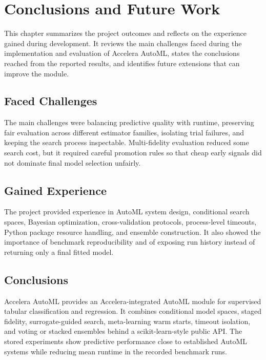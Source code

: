 \documentclass[12pt,a4paper,oneside]{report}
\newcommand{\systemname}{Accelera AutoML}
\begin{document}
\chapter{Conclusions and Future Work}
\label{chap:conclusion}

This chapter summarizes the project outcomes and reflects on the experience
gained during development. It reviews the main challenges faced during the
implementation and evaluation of \systemname{}, states the conclusions reached
from the reported results, and identifies future extensions that can improve
the module.

\section{Faced Challenges}

The main challenges were balancing predictive quality with runtime, preserving
fair evaluation across different estimator families, isolating trial failures,
and keeping the search process inspectable. Multi-fidelity evaluation reduced
some search cost, but it required careful promotion rules so that cheap early
signals did not dominate final model selection unfairly.

\section{Gained Experience}

The project provided experience in AutoML system design, conditional search
spaces, Bayesian optimization, cross-validation protocols, process-level
timeouts, Python package resource handling, and ensemble construction. It also
showed the importance of benchmark reproducibility and of exposing run history
instead of returning only a final fitted model.

\section{Conclusions}

\systemname{} provides an Accelera-integrated AutoML module for supervised
tabular classification and regression. It combines conditional model spaces,
staged fidelity, surrogate-guided search, meta-learning warm starts, timeout
isolation, and voting or stacked ensembles behind a scikit-learn-style public
API. The stored experiments show predictive performance close to established
AutoML systems while reducing mean runtime in the recorded benchmark runs.
\end{document}
